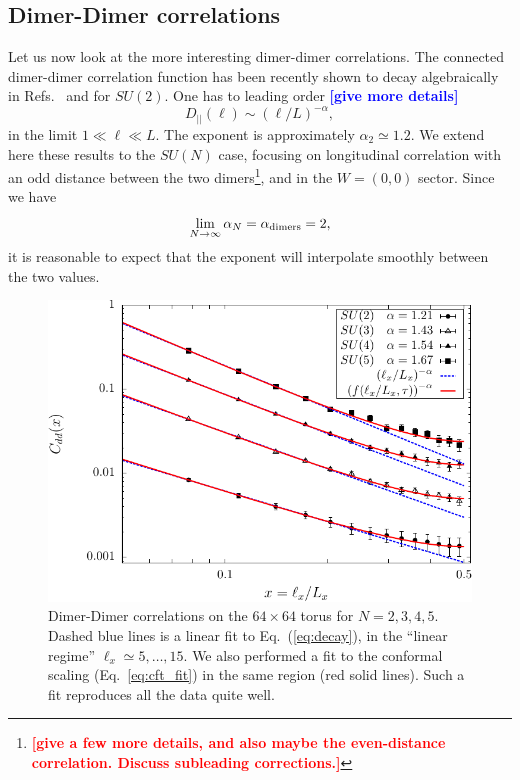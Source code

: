 \documentclass[11pt]{iopart}
\begin{document}
\subsection{Dimer-Dimer correlations}
Let us now look at the more interesting dimer-dimer correlations. The connected dimer-dimer correlation function has been recently shown to decay algebraically in Refs.~\cite{RVB1} and \cite{RVB2} for $SU(2)$. One has to leading order \textcolor{blue}{\bf [give more details]}
\begin{equation}\label{eq:decay}
 D_{||}(\ell) \sim (\ell/L)^{-\alpha},
\end{equation}
in the limit $1\ll \ell \ll L$.
The exponent is approximately $\alpha_2\simeq 1.2$. We extend here these results to the $SU(N)$ case, focusing on longitudinal correlation with an odd distance between the two dimers\footnote{\textcolor{red}{\bf [give a few more details, and also maybe the even-distance correlation. Discuss subleading corrections.]}}, and in the $W=(0,0)$ sector. Since we have
\begin{equation}
 \lim_{N \to \infty} \alpha_N=\alpha_{\rm dimers}=2,
\end{equation}
it is reasonable to expect that the exponent will interpolate smoothly between the two values. 
\begin{figure}[ht]
 \begin{center}
  \includegraphics{./figures/corr_su2.pdf}
 \end{center}
\caption{Dimer-Dimer correlations on the $64 \times 64$ torus for $N=2,3,4,5$. Dashed blue lines is a linear fit to Eq.~(\ref{eq:decay}), in the ``linear regime'' $\ell_x \simeq 5,\ldots,15$. We also performed a fit to the conformal scaling (Eq.~\ref{eq:cft_fit}) in the same region (red solid lines). Such a fit reproduces all the data quite well.}
\label{fig:corr_su2_dimers}
\end{figure}
\end{document}
